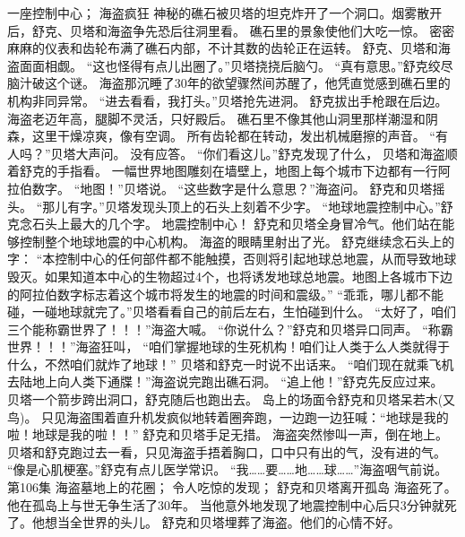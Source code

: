 \documentclass[a4paper,12pt,UTF8,twoside]{ctexbook}
\begin{document}
        一座控制中心； 
        海盗疯狂   
        神秘的礁石被贝塔的坦克炸开了一个洞口。烟雾散开后，舒克、贝塔和海盗争先恐后往洞里看。 
        礁石里的景象使他们大吃一惊。 
        密密麻麻的仪表和齿轮布满了礁石内部，不计其数的齿轮正在运转。 
        舒克、贝塔和海盗面面相觑。 
        “这也怪得有点儿出圈了。”贝塔挠挠后脑勺。 
        “真有意思。”舒克绞尽脑汁破这个谜。 
        海盗那沉睡了30年的欲望骤然间苏醒了，他凭直觉感到礁石里的机构非同异常。 
        “进去看看，我打头。”贝塔抢先进洞。 
        舒克拔出手枪跟在后边。 
        海盗老迈年高，腿脚不灵活，只好殿后。 
        礁石里不像其他山洞里那样潮湿和阴森，这里干燥凉爽，像有空调。 
        所有齿轮都在转动，发出机械磨擦的声音。 
        “有人吗？”贝塔大声问。 
        没有应答。 
        “你们看这儿。”舒克发现了什么， 
        贝塔和海盗顺着舒克的手指看。 
        一幅世界地图雕刻在墙壁上，地图上每个城市下边都有一行阿拉伯数字。 
        “地图！”贝塔说。 
        “这些数字是什么意思？”海盗问。 
        舒克和贝塔摇头。 
        “那儿有字。”贝塔发现头顶上的石头上刻着不少字。 
        “地球地震控制中心。”舒克念石头上最大的几个字。 
        地震控制中心！ 
        舒克和贝塔全身冒冷气。他们站在能够控制整个地球地震的中心机构。 
        海盗的眼睛里射出了光。 
        舒克继续念石头上的字： 
        “本控制中心的任何部件都不能触摸，否则将引起地球总地震，从而导致地球毁灭。如果知道本中心的生物超过4个，也将诱发地球总地震。地图上各城市下边的阿拉伯数字标志着这个城市将发生的地震的时间和震级。” 
        “乖乖，哪儿都不能碰，一碰地球就完了。”贝塔看看自己的前后左右，生怕碰到什么。 
        “太好了，咱们三个能称霸世界了！！！”海盗大喊。 
        “你说什么？”舒克和贝塔异口同声。 
        “称霸世界！！！”海盗狂叫，  “咱们掌握地球的生死机构！咱们让人类于么人类就得于什么，不然咱们就炸了地球！” 
        贝塔和舒克一时说不出话来。 
        “咱们现在就乘飞机去陆地上向人类下通牒！”海盗说完跑出礁石洞。 
        “追上他！”舒克先反应过来。 
        贝塔一个箭步跨出洞口，舒克随后也跑出去。 
        岛上的场面令舒克和贝塔呆若木(又鸟)。 
        只见海盗围着直升机发疯似地转着圈奔跑，一边跑一边狂喊：“地球是我的啦！地球是我的啦！！” 
        舒克和贝塔手足无措。 
        海盗突然惨叫一声，倒在地上。 
        贝塔和舒克跑过去一看，只见海盗手捂着胸口，口中只有出的气，没有进的气。 
        “像是心肌梗塞。”舒克有点儿医学常识。 
        “我……要……地……球……”海盗咽气前说。   第106集 
        海盗墓地上的花圈； 
        令人吃惊的发现； 
        舒克和贝塔离开孤岛   
        海盗死了。 
        他在孤岛上与世无争生活了30年。 
        当他意外地发现了地震控制中心后只3分钟就死了。他想当全世界的头儿。 
        舒克和贝塔埋葬了海盗。他们的心情不好。 
\end{document}
